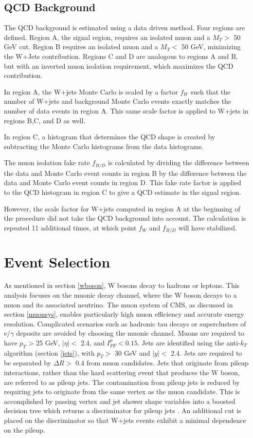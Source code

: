 \documentclass[oneside, letterpaper, oldfontcommands]{memoir}
\begin{document}
\subsection{QCD Background}\label{qcdestimate}

\qquad The QCD background is estimated using a data driven method. Four regions are defined. Region A, the signal region, requires an isolated muon and a $M_{T} >$ 50 GeV cut. Region B requires an isolated muon and a $M_{T} <$ 50 GeV, minimizing the W+Jets contribution. Regions C and D are analogous to regions A and B, but with an inverted muon isolation requirement, which maximizes the QCD contribution.

\qquad In region A, the W+jets Monte Carlo is scaled by a factor $f_{W}$ such that the number of W+jets and background Monte Carlo events exactly matches the number of data events in region A. This same scale factor is applied to W+jets in regions B,C, and D as well.

\qquad In region C, a histogram that determines the QCD shape is created by subtracting the Monte Carlo histograms from the data histograms. 

\qquad The muon isolation fake rate $f_{B/D}$ is calculated by dividing the difference between the data and Monte Carlo event counts in region B by the difference between the data and Monte Carlo event counts in region D. This fake rate factor is applied to the QCD histogram in region C to give a QCD estimate in the signal region. 

\qquad However, the scale factor for W+jets computed in region A at the beginning of the procedure did not take the QCD background into account. The calculation is repeated 11 additional times, at which point $f_{W}$ and $f_{B/D}$ will have stabilized.
 
\section{Event Selection}
\qquad As mentioned in section \ref{wboson}, W bosons decay to hadrons or leptons. This analysis focuses on the muonic decay channel, where the W boson decays to a muon and its associated neutrino. The muon system of CMS, as discussed in section \ref{muonsys}, enables particularly high muon efficiency and accurate energy resolution. Complicated scenarios such as hadronic tau decays or superclusters of e/$\gamma$ deposits are avoided by choosing the muonic channel. Muons are required to have $p_{T}$ > 25 GeV, $|\eta| <$ 2.4, and $I_{PF}^{\mu} < 0.15$. Jets are identified using the anti-$k_{T}$ algorithm (section \ref{jets}), with $p_{T} >$ 30 GeV and $|y| <$ 2.4. Jets are required to be separated by $\Delta R >$ 0.4 from muon candidates. Jets that originate from pileup interactions, rather than the hard scattering event that produces the W boson, are referred to as pileup jets. The contamination from pileup jets is reduced by requiring jets to originate from the same vertex as the muon candidate. This is accomplished by passing vertex and jet shower shape variables into a boosted decision tree which returns a discriminator for pileup jets \cite{CMS-PAS-JME-13-005}. An additional cut is placed on the discriminator so that W+jets events exhibit a minimal dependence on the pileup.
\end{document}
